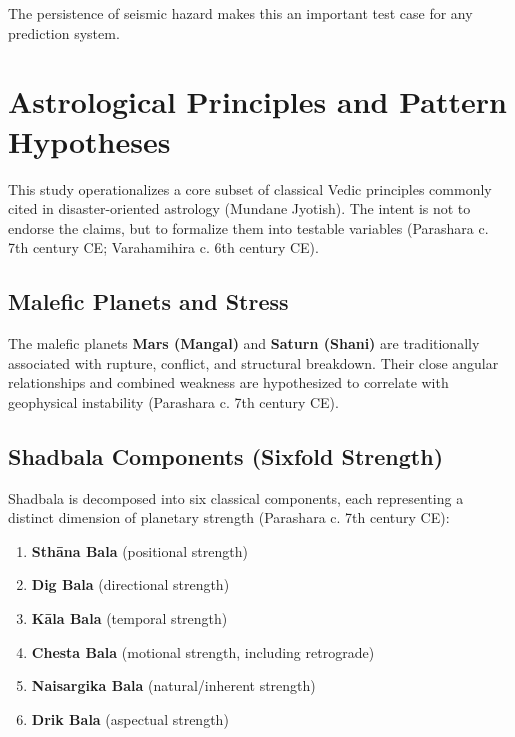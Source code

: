 \documentclass[
  11pt,
  a4paper,
  oneside,
  openany]{article}
\providecommand{\tightlist}{%
  \setlength{\itemsep}{0pt}\setlength{\parskip}{0pt}}\usepackage{longtable,booktabs,array}
\begin{document}
The persistence of seismic hazard makes this an important test case for
any prediction system.

\section{Astrological Principles and Pattern
Hypotheses}\label{astrological-principles-and-pattern-hypotheses}

This study operationalizes a core subset of classical Vedic principles
commonly cited in disaster-oriented astrology (Mundane Jyotish). The
intent is not to endorse the claims, but to formalize them into testable
variables (Parashara c. 7th century CE; Varahamihira c. 6th century CE).

\subsection{Malefic Planets and
Stress}\label{malefic-planets-and-stress}

The malefic planets \textbf{Mars (Mangal)} and \textbf{Saturn (Shani)}
are traditionally associated with rupture, conflict, and structural
breakdown. Their close angular relationships and combined weakness are
hypothesized to correlate with geophysical instability (Parashara c. 7th
century CE).

\subsection{Shadbala Components (Sixfold
Strength)}\label{shadbala-components-sixfold-strength-1}

Shadbala is decomposed into six classical components, each representing
a distinct dimension of planetary strength (Parashara c. 7th century
CE):

\begin{enumerate}
\def\labelenumi{\arabic{enumi}.}
\tightlist
\item
  \textbf{Sthāna Bala} (positional strength)
\item
  \textbf{Dig Bala} (directional strength)
\item
  \textbf{Kāla Bala} (temporal strength)
\item
  \textbf{Chesta Bala} (motional strength, including retrograde)
\item
  \textbf{Naisargika Bala} (natural/inherent strength)
\item
  \textbf{Drik Bala} (aspectual strength)
\end{enumerate}
\end{document}
